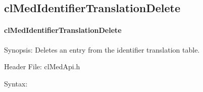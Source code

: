 \begin{flushleft}
\subsection{clMedIdentifierTranslationDelete}
\hypertarget{pagemed105}{}\paragraph{cl\-Med\-Identifier\-Translation\-Delete}\label{pagemed105}
\begin{Desc}
\item[Synopsis:]Deletes an entry from the identifier translation table.\end{Desc}
\begin{Desc}
\item[Header File:]clMedApi.h\end{Desc}
\begin{Desc}
\item[Syntax:]


\end{Desc}
\end{flushleft}
